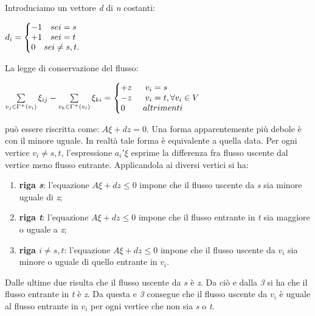 \documentclass[11pt]{book}
\makeatletter
\newenvironment{sistema}%
{\left\lbrace\begin{array}{@{}l@{}}}%
{\end{array}\right.}
\makeatother
\begin{document}
Introduciamo un vettore {\em d} di {\em n} costanti:

\begin{center}
  $d_i = 
  \begin{sistema}
    -1 \quad se i=s\\
    +1 \quad se i=t\\
    0 \quad se i \neq s,t.
  \end{sistema}
$  
\end{center}

La legge di conservazione del flusso:

\vspace{11pt}
\begin{center}
$\sum\limits_{v_j \in \Gamma^+ (v_i)}\xi_{ij} - \sum\limits_{v_k \in \Gamma^+ (v_i)}\xi_{ki} = \begin{sistema}
+z\phantom{aaa}v_i=s\\
-z\phantom{aaa}v_i=t, \forall v_i \in V\\
0\phantom{aaaa}altrimenti
\end{sistema}$
\end{center}
\vspace{11pt}

pu\`o essere riscritta come: $A\xi + dz = 0$. Una forma apparentemente
pi\`u debole \`e con il minore uguale. In realt\`a tale forma \`e
equivalente a quella data. Per ogni vertice $v_i \neq s, t$,
l'espressione $a_i'\xi$ esprime la differenza fra flusso uscente dal
vertice meno flusso entrante. Applicandola ai diversi vertici si ha:

\begin{enumerate}
\item {\bf riga {\em s}}: l'equazione $A\xi + dz \leq 0$ impone che il
  flusso uscente da {\em s} sia minore uguale di {\em z};
\item {\bf riga {\em t}}: l'equazione $A\xi + dz \leq 0$ impone che il
  flusso entrante in {\em t} sia maggiore o uguale a {\em z};
\item {\bf riga $i \neq s,t$}: l'equazione $A\xi + dz \leq 0$ impone
  che il flusso uscente da $v_i$ sia minore o uguale di quello
  entrante in $v_i$.
\end{enumerate}

Dalle ultime due risulta che il flusso uscente da $s$ \`e {\em z}. Da
ci\`o e dalla {\em 3} si ha che il flusso entrante in {\em t} \`e {\em
  z}. Da questa e {\em 3} consegue che il flusso uscente da $v_i$ \`e
uguale al flusso entrante in $v_i$ per ogni vertice che non sia {\em
  s} o {\em t}.
\end{document}
